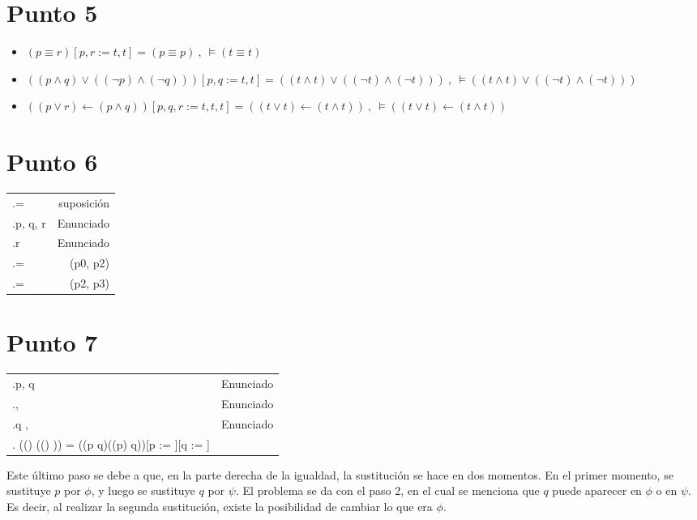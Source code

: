\documentclass{article}
\newlength{\logicv}
\newenvironment{logicenv}[2][0]{
  \begin{tcolorbox}[demo, title = #2]
  \vspace*{#1\logicv}
}{
  \end{tcolorbox}
}
\newenvironment{logic}{
    \setlength{\extrarowheight}{3pt}
    \setcounter{row}{-1}
    \begin{center}
    \begin{NiceTabular}{>{\stepcounter{row}\therow.\hspace*{5pt}} L r }
}{
    \end{NiceTabular}
    \end{center}
}
\begin{document}
\section{Punto 5}
\begin{logicenv}[5]{punto 5}
    \begin{itemize}
        \item $(p \equiv r)[p, r := t, t] = (p \equiv p)\ ,\ \vDash (t \equiv t)$
        \item $((p \land q) \lor ((\neg p) \land (\neg q)))[p, q := t, t] = ((t \land t) \lor ((\neg t) \land (\neg t)))\ ,\ \vDash ((t \land t) \lor ((\neg t) \land (\neg t)))$
        \item $((p \lor r) \gets (p \land q))[p, q, r := t, t, t] = ((t \lor t) \gets (t \land t))\ ,\ \vDash ((t \lor t) \gets (t \land t))$
    \end{itemize}
\end{logicenv}

\section{Punto 6}
\begin{logicenv}{punto 6}
    \begin{logic}
        \gamma = \psi[q := r] & suposición\\
        p, q, r  & Enunciado\\
        r  \phi {} \psi & Enunciado\\
        \phi[p := \gamma] = \phi[p := \psi][q := r] & (p0, p2)\\
        \phi[p := \psi][q := r][q := \tau][r := q] = \phi[p, q := \psi, \tau] & (p2, p3)
    \end{logic}
\end{logicenv}

\section{Punto 7}

\begin{logicenv}[5]{punto 7}
    \begin{logic}
        p, q  & Enunciado\\
        \phi, \psi {} & Enunciado\\
        q  \phi, \psi & Enunciado\\
         ((\phi \to \psi) \equiv ((\neg \phi) \lor \psi)) \not= ((p \to q)\equiv ((\neg p) \lor q))[p := \phi][q := \psi]
    \end{logic}
    Este último paso se debe a que, en la parte derecha de la igualdad, la sustitución se hace en dos momentos. En el primer momento, se sustituye $p$ por $\phi$, y luego se sustituye $q$ por $\psi$. El problema se da con el paso 2, en el cual se menciona que $q$ puede aparecer en $\phi$ o en $\psi$. Es decir, al realizar la segunda sustitución, existe la posibilidad de cambiar lo que era $\phi$.
\end{logicenv}
\end{document}
